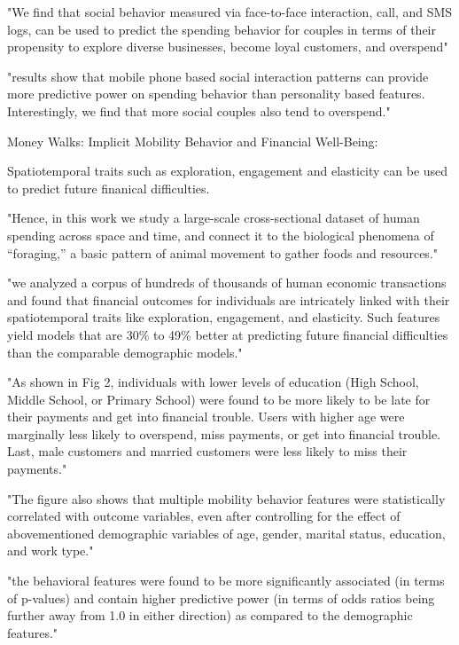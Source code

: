 "We find that social behavior measured via face-to-face interaction, call, and SMS logs, can be used to predict the spending behavior for couples in terms of their propensity to explore diverse businesses, become loyal customers, and overspend"

"results show that mobile phone based social interaction patterns can provide more predictive power on spending behavior than personality based features. Interestingly, we find that more social couples also tend to overspend."




Money Walks: Implicit Mobility Behavior and Financial Well-Being:

Spatiotemporal traits such as exploration, engagement and elasticity can be used to predict future finanical difficulties. 

"Hence, in this work we study a large-scale cross-sectional dataset of human spending across space and time, and connect it to the biological phenomena of “foraging,” a basic pattern of animal movement to gather foods and resources."

"we analyzed a corpus of hundreds of thousands of human economic transactions and found that financial outcomes for individuals are intricately linked with their spatiotemporal traits like exploration, engagement, and elasticity. Such features yield models that are 30\% to 49\% better at predicting future financial difficulties than the comparable demographic models."

"As shown in Fig 2, individuals with lower levels of education (High School, Middle School, or Primary School) were found to be more likely to be late for their payments and get into financial trouble. Users with higher age were marginally less likely to overspend, miss payments, or get into financial trouble. Last, male customers and married customers were less likely to miss their payments."

"The figure also shows that multiple mobility behavior features were statistically correlated with outcome variables, even after controlling for the effect of abovementioned demographic variables of age, gender, marital status, education, and work type."

"the behavioral features were found to be more significantly associated (in terms of p-values) and contain higher predictive power (in terms of odds ratios being further away from 1.0 in either direction) as compared to the demographic features."

